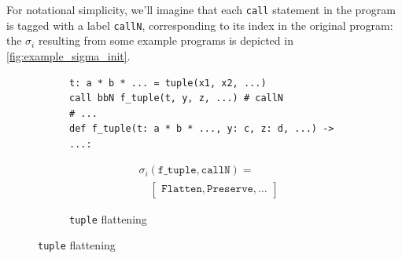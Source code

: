 For notational simplicity, we'll imagine that each \texttt{call} statement in
the program is tagged with a label \texttt{callN}, corresponding to its index in
the original program: the $\sigma_i$ resulting from some example programs is
depicted in \cref{fig:example_sigma_init}.

\begin{figure}[htbp]
  \centering
  \begin{subfigure}{\textwidth}
    \caption{\texttt{tuple} flattening}
    \label{fig:example_sigma_init_tuple}
    \vspace{1mm}
    \begin{minipage}[c]{0.52\textwidth}
\begin{verbatim}
t: a * b * ... = tuple(x1, x2, ...)
call bbN f_tuple(t, y, z, ...) # callN
# ...
def f_tuple(t: a * b * ..., y: c, z: d, ...) -> ...:
\end{verbatim}
    \end{minipage}\hfill
    \begin{minipage}[c]{0.45\textwidth}
      \[
      \begin{aligned}
        & \sigma_i(\texttt{f\_tuple}, \texttt{callN}) = \\
        & \quad \begin{bmatrix}
          \texttt{Flatten}, \texttt{Preserve}, \dots
        \end{bmatrix}
      \end{aligned}
      \]
    \end{minipage}
  \end{subfigure}

  \vspace{3mm}


\end{figure}
